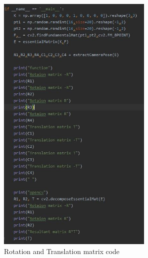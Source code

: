 \documentclass[12pt]{article}
\begin{document}
\begin{figure}[h]
    \centering
    \includegraphics[width=7.5cm]{camecode}
    \caption{Rotation and Translation matrix code}
    \label{fig:Rotation and Translation matrix code}
\end{figure}
\end{document}
